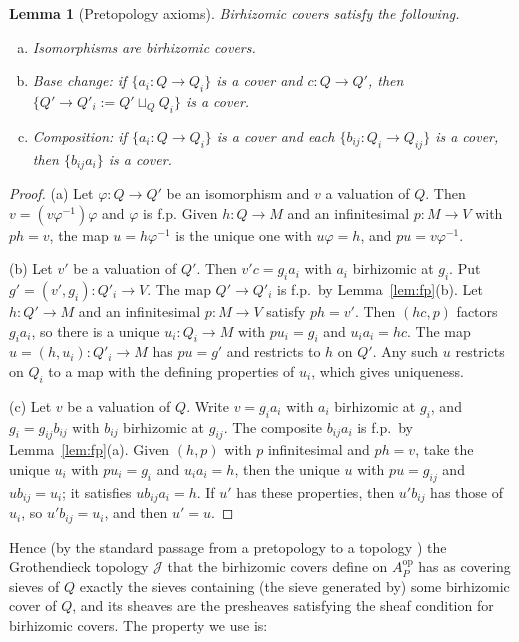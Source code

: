 \documentclass[11pt]{article}
\newtheorem{lemma}[theorem]{Lemma}
\theoremstyle{definition}
\theoremstyle{remark}
\newcommand{\cJ}{\mathcal{J}}
\begin{document}
\begin{lemma}[Pretopology axioms]\label{lem:pretop}
Birhizomic covers satisfy the following.
\begin{enumerate}[(a)]
\item Isomorphisms are birhizomic covers.
\item Base change: if $\{a_i\colon Q\to Q_i\}$ is a cover and $c\colon Q\to Q'$, then $\{Q'\to Q'_i:=Q'\sqcup_Q Q_i\}$ is a cover.
\item Composition: if $\{a_i\colon Q\to Q_i\}$ is a cover and each $\{b_{ij}\colon Q_i\to Q_{ij}\}$ is a cover, then $\{b_{ij}a_i\}$ is a cover.
\end{enumerate}
\end{lemma}
\begin{proof}
(a) Let $\varphi\colon Q\to Q'$ be an isomorphism and $v$ a valuation of $Q$. Then $v=(v\varphi^{-1})\varphi$ and $\varphi$ is f.p. Given $h\colon Q\to M$ and an infinitesimal $p\colon M\to V$ with $ph=v$, the map $u=h\varphi^{-1}$ is the unique one with $u\varphi=h$, and $pu=v\varphi^{-1}$.

(b) Let $v'$ be a valuation of $Q'$. Then $v'c=g_ia_i$ with $a_i$ birhizomic at $g_i$. Put $g'=(v',g_i)\colon Q'_i\to V$. The map $Q'\to Q'_i$ is f.p.\ by Lemma~\ref{lem:fp}(b). Let $h\colon Q'\to M$ and an infinitesimal $p\colon M\to V$ satisfy $ph=v'$. Then $(hc,p)$ factors $g_ia_i$, so there is a unique $u_i\colon Q_i\to M$ with $pu_i=g_i$ and $u_ia_i=hc$. The map $u=(h,u_i)\colon Q'_i\to M$ has $pu=g'$ and restricts to $h$ on $Q'$. Any such $u$ restricts on $Q_i$ to a map with the defining properties of $u_i$, which gives uniqueness.

(c) Let $v$ be a valuation of $Q$. Write $v=g_ia_i$ with $a_i$ birhizomic at $g_i$, and $g_i=g_{ij}b_{ij}$ with $b_{ij}$ birhizomic at $g_{ij}$. The composite $b_{ij}a_i$ is f.p.\ by Lemma~\ref{lem:fp}(a). Given $(h,p)$ with $p$ infinitesimal and $ph=v$, take the unique $u_i$ with $pu_i=g_i$ and $u_ia_i=h$, then the unique $u$ with $pu=g_{ij}$ and $ub_{ij}=u_i$; it satisfies $ub_{ij}a_i=h$. If $u'$ has these properties, then $u'b_{ij}$ has those of $u_i$, so $u'b_{ij}=u_i$, and then $u'=u$.
\end{proof}

Hence (by the standard passage from a pretopology to a topology \cite[Exp.~II, \S1]{SGA4}) the Grothendieck topology $\cJ$ that the birhizomic covers define on $A_P^{\mathrm{op}}$ has as covering sieves of $Q$ exactly the sieves containing (the sieve generated by) some birhizomic cover of $Q$, and its sheaves are the presheaves satisfying the sheaf condition for birhizomic covers. The property we use is:
\end{document}
